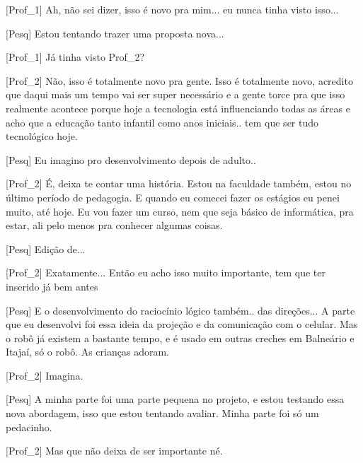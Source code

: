 [Prof\_1] Ah, não sei dizer, isso é novo pra mim... eu nunca tinha visto isso...
    
[Pesq] Estou tentando trazer uma proposta nova...

[Prof\_1] Já tinha visto Prof\_2? 

[Prof\_2] Não, isso é totalmente novo pra gente. Isso é totalmente novo, acredito que daqui mais um tempo vai ser super necessário e a gente torce pra que isso realmente acontece porque hoje a tecnologia está influenciando todas as áreas e acho que a educação tanto infantil como anos iniciais.. tem que ser tudo tecnológico hoje.
    
[Pesq] Eu imagino pro desenvolvimento depois de adulto..

[Prof\_2] É, deixa te contar uma história. Estou na faculdade também, estou no último período de pedagogia. E quando eu comecei fazer os estágios eu penei muito, até hoje. Eu vou fazer um curso, nem que seja básico de informática, pra estar, ali pelo menos pra conhecer algumas coisas.
    
[Pesq] Edição de...

[Prof\_2] Exatamente... Então eu acho isso muito importante, tem que ter inserido já bem antes
    
[Pesq] E o desenvolvimento do raciocínio lógico também.. das direções... A parte que eu desenvolvi foi essa ideia da projeção e da comunicação com o celular. Mas o robô já existem a bastante tempo, e é usado em outras creches em Balneário e Itajaí, só o robô. As crianças adoram.

[Prof\_2] Imagina.
    
[Pesq] A minha parte foi uma parte pequena no projeto, e estou testando essa nova abordagem, isso que estou tentando avaliar. Minha parte foi só um pedacinho.

[Prof\_2] Mas que não deixa de ser importante né.